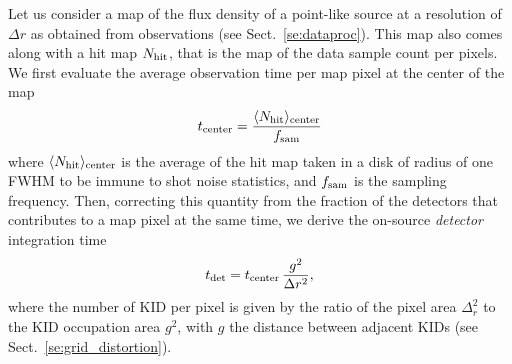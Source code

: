 Let us consider a map of the flux density of a point-like source at a
resolution of $\Delta r$ as obtained from observations (see
Sect.~\ref{se:dataproc}).
This map also comes along with a hit map $N_{\rm{hit}}$, that is the
map of the data sample count per pixels. We first evaluate the
average observation time per map pixel at the center of the map
%
%
\begin{equation}
t_{\rm{center}} = \frac{\langle N_{\rm{hit}}\rangle_{\rm{center}}}{f_{\rm{sam}}} 
\end{equation}
where $\langle N_{\rm{hit}}\rangle_{\rm{center}}$ is the average of
the hit map taken in a disk of radius of one FWHM to be immune to shot
noise statistics, and $f_{\rm{sam}}$ is the sampling frequency. 
Then, correcting this quantity from the fraction of the detectors that
contributes to a map pixel at the same time, we derive the on-source
\emph{detector} integration time
%
\begin{equation}
  t_{\rm{det}} = t_{\rm{center}}\, \frac{g^2}{\Delta r^2},
\label{eq:t_det}
\end{equation}
%
where the number of KID per pixel is given by the ratio of the
pixel area $\Delta_r^2$ to the KID occupation area $g^2$, with $g$
the distance between adjacent KIDs (see
Sect.~\ref{se:grid_distortion}).

%
%

